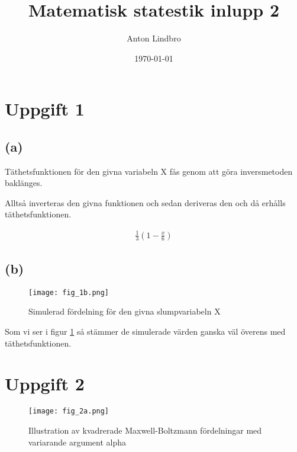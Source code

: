 \documentclass[a4paper]{article}
\title{Matematisk statestik inlupp 2}
\author{Anton Lindbro}
\date{\today}
\begin{document}
\maketitle

\section{Uppgift 1}

\subsection{(a)}
Täthetsfunktionen för den givna variabeln X fås genom att göra inversmetoden baklänges.

Alltså inverteras den givna funktionen och sedan deriveras den och då erhålls täthetsfunktionen.

\begin{align}
    \frac{1}{3}(1 - \frac{x}{6})
\end{align}

\subsection{(b)}
\begin{figure}[H]
    \begin{small}
        \begin{center}
            \texttt{[image: fig\_1b.png]}
        \end{center}
        \caption{Simulerad fördelning för den givna slumpvariabeln X}
        \label{fig:1b}
    \end{small}
\end{figure}

Som vi ser i figur \ref{fig:1b} så stämmer de simulerade värden ganska väl överens med täthetsfunktionen. 

\section{Uppgift 2}

\begin{figure}[H]
    \begin{small}
        \begin{center}
            \texttt{[image: fig\_2a.png]}
        \end{center}
        \caption{Illustration av kvadrerade Maxwell-Boltzmann fördelningar med variarande argument alpha}
        \label{fig:2a}
    \end{small}
\end{figure}
\end{document}
